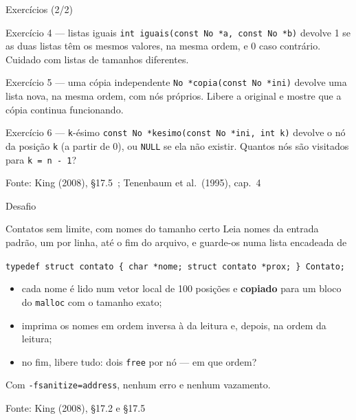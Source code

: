 \documentclass[aspectratio=169]{beamer}
\newcommand{\fonte}[1]{\vfill\hfill{\scriptsize\textcolor{UFSGray}{Fonte: #1}}}
\begin{document}
\begin{frame}{Exercícios (2/2)}
  \footnotesize
  \begin{block}{Exercício 4 --- listas iguais}
    \texttt{int iguais(const No *a, const No *b)} devolve 1 se as duas listas
    têm os mesmos valores, na mesma ordem, e 0 caso contrário. Cuidado com
    listas de tamanhos diferentes.
  \end{block}
  \begin{block}{Exercício 5 --- uma cópia independente}
    \texttt{No *copia(const No *ini)} devolve uma lista nova, na mesma ordem,
    com nós próprios. Libere a original e mostre que a cópia continua
    funcionando.
  \end{block}
  \begin{block}{Exercício 6 --- \texttt{k}-ésimo}
    \texttt{const No *kesimo(const No *ini, int k)} devolve o nó da posição
    \texttt{k} (a partir de 0), ou \texttt{NULL} se ela não existir.
    Quantos nós são visitados para \texttt{k = n - 1}?
  \end{block}
  \fonte{King (2008), §17.5~\cite{king2008c};
    Tenenbaum et al.\ (1995), cap.~4~\cite{tenenbaum1995estruturas}}
\end{frame}

\begin{frame}{Desafio}
  \begin{block}{Contatos sem limite, com nomes do tamanho certo}
    \small Leia nomes da entrada padrão, um por linha, até o fim do arquivo,
    e guarde-os numa lista encadeada de
    \begin{center}
      \texttt{typedef struct contato \{ char *nome; struct contato *prox; \} Contato;}
    \end{center}
    \vspace{-0.6em}
    \begin{itemize}
      \item cada nome é lido num vetor local de 100 posições e
        \textbf{copiado} para um bloco do \texttt{malloc} com o tamanho exato;
      \item imprima os nomes em ordem inversa à da leitura e, depois, na
        ordem da leitura;
      \item no fim, libere tudo: dois \texttt{free} por nó --- em que ordem?
    \end{itemize}
    Com \texttt{-fsanitize=address}, nenhum erro e nenhum vazamento.
  \end{block}
  \fonte{King (2008), §17.2 e §17.5~\cite{king2008c}}
\end{frame}
\end{document}
